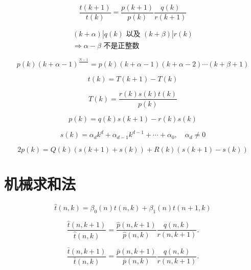 \begin{equation}
    \frac{t(k+1)}{t(k)}=\frac{p(k+1)}{p(k)} \frac{q(k)}{r(k+1)}
\end{equation}

\begin{equation}
    \begin{gathered}
    (k+\alpha) | q(k) \text { 以及 }(k+\beta) | r(k) \\
    \Rightarrow \alpha-\beta \text { 不是正整数 }
    \end{gathered}
\end{equation}

\begin{equation}
    p(k)(k+\alpha-1)^{\frac{N-1}{}}=p(k)(k+\alpha-1)(k+\alpha-2) \cdots(k+\beta+1)
\end{equation}

\begin{equation}
    t(k)=T(k+1)-T(k)
\end{equation}

\begin{equation}
    T(k)=\frac{r(k) s(k) t(k)}{p(k)}
\end{equation}

\begin{equation}
    p(k)=q(k) s(k+1)-r(k) s(k)
\end{equation}

\begin{equation}
    s(k)=\alpha_{d} k^{d}+\alpha_{d-1} k^{d-1}+\cdots+\alpha_{0}, \quad \alpha_{d} \neq 0
\end{equation}

\begin{equation}
    2 p(k)=Q(k)(s(k+1)+s(k))+R(k)(s(k+1)-s(k))
\end{equation}

\section{机械求和法}

\setcounter{equation}{125}
\begin{equation}
    \hat{t}(n, k)=\beta_{0}(n) t(n, k)+\beta_{1}(n) t(n+1, k)
\end{equation}

\begin{equation}
    \frac{\hat{t}(n, k+1)}{\hat{t}(n, k)}=\frac{\hat{p}(n, k+1)}{\hat{p}(n, k)} \frac{q(n, k)}{r(n, k+1)} .
\end{equation}

\begin{equation}
    \frac{\bar{t}(n, k+1)}{\bar{t}(n, k)}=\frac{\bar{p}(n, k+1)}{\bar{p}(n, k)} \frac{q(n, k)}{r(n, k+1)} .
\end{equation}

